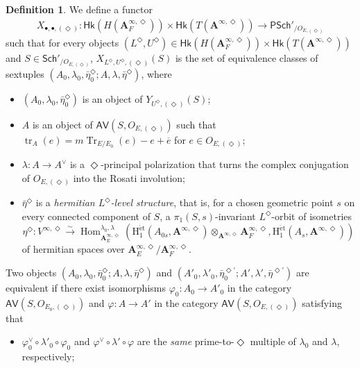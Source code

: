 \documentclass[12pt]{amsart}
\numberwithin{equation}{section}
\theoremstyle{plain}
\theoremstyle{definition}
\newtheorem{definition}[proposition]{Definition}
\theoremstyle{remark}
\renewcommand{\b}[1]{\mathbf{#1}}
\renewcommand{\r}[1]{\mathrm{#1}}
\renewcommand{\sf}[1]{\mathsf{#1}}
\renewcommand{\(}{\left(}
\renewcommand{\)}{\right)}
\newcommand{\ol}[1]{\overline{#1}{}}
\newcommand{\bA}{\b A}
\newcommand{\rH}{\r H}
\newcommand{\sfP}{\sf P}
\newcommand{\et}{{\acute{\r{e}}\r{t}}}
\newcommand{\Sch}{\sf{Sch}}
\newcommand{\AV}{\sf{AV}}
\newcommand{\Hk}{\sf{Hk}}
\DeclareMathOperator{\Hom}{Hom}
\DeclareMathOperator{\tr}{tr}
\DeclareMathOperator{\Tr}{Tr}
\begin{document}
\begin{definition}\label{de:moduli_integral}
We define a functor
\begin{align*}
X_{\bullet,\bullet,(\Diamond)}\colon
\Hk(H(\bA_F^{\infty,\Diamond}))\times\Hk(T(\bA^{\infty,\Diamond}))\to\sfP\Sch'_{/O_{E,(\Diamond)}}
\end{align*}
such that for every objects $(L^\Diamond,U^\Diamond)\in\Hk(H(\bA_F^{\infty,\Diamond}))\times\Hk(T(\bA^{\infty,\Diamond}))$ and $S\in\Sch'_{/O_{E,(\Diamond)}}$, $X_{L^\Diamond,U^\Diamond,(\Diamond)}(S)$ is the set of equivalence classes of sextuples $(A_0,\lambda_0,\bar\eta_0^\Diamond;A,\lambda,\bar\eta^\Diamond)$, where
\begin{itemize}
  \item $(A_0,\lambda_0,\bar\eta_0^\Diamond)$ is an object of $Y_{U^\Diamond,(\Diamond)}(S)$;

  \item $A$ is an object of $\AV(S,O_{E,(\Diamond)})$ such that $\tr_A(e)=m\Tr_{E/E_0}(e)-e+\ol{e}$ for $e\in O_{E,(\Diamond)}$;

  \item $\lambda\colon A\to A^\vee$ is a $\Diamond$-principal polarization that turns the complex conjugation of $O_{E,(\Diamond)}$ into the Rosati involution;

  \item $\bar\eta^\Diamond$ is a \emph{hermitian $L^\Diamond$-level structure}, that is, for a chosen geometric point $s$ on every connected component of $S$, a $\pi_1(S,s)$-invariant $L^\Diamond$-orbit of isometries
      \[
      \eta^\Diamond\colon V^{\infty,\Diamond}\xrightarrow\sim\Hom_{\bA_E^{\infty,\Diamond}}^{\lambda_0,\lambda}
      \(\rH_1^{\et}(A_{0s},\bA^{\infty,\Diamond})\otimes_{\bA^{\infty,\Diamond}}\bA_F^{\infty,\Diamond},
      \rH_1^{\et}(A_s,\bA^{\infty,\Diamond})\)
      \]
      of hermitian spaces over $\bA_E^{\infty,\Diamond}/\bA_F^{\infty,\Diamond}$.
\end{itemize}
Two objects $(A_0,\lambda_0,\bar\eta_0^\Diamond;A,\lambda,\bar\eta^\Diamond)$ and $(A'_0,\lambda'_0,\bar\eta_0^{\Diamond\prime};A',\lambda',\bar\eta^{\Diamond\prime})$ are equivalent if there exist isomorphisms $\varphi_0\colon A_0\to A'_0$ in the category $\AV(S,O_{E_0,(\Diamond)})$ and $\varphi\colon A\to A'$ in the category $\AV(S,O_{E,(\Diamond)})$ satisfying that
\begin{itemize}
  \item $\varphi_0^\vee\circ\lambda'_0\circ\varphi_0$ and $\varphi^\vee\circ\lambda'\circ\varphi$ are the \emph{same} prime-to-$\Diamond$ multiple of $\lambda_0$ and $\lambda$, respectively;


\end{itemize}
\end{definition}
\end{document}
